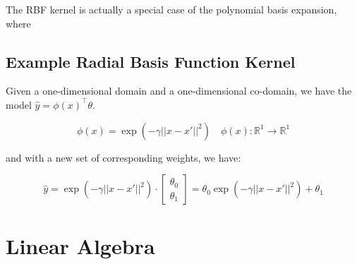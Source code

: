     The RBF kernel is actually a special case of the polynomial basis expansion, where 


\subsection{Example Radial Basis Function Kernel}
Given a one-dimensional domain and a one-dimensional co-domain, we have the model $\hat{y} = \phi(x)^\top \theta$.

\begin{equation}
    \phi(x) = \exp(-\gamma ||x - x'||^2) \quad \phi(x) : \mathbb{R}^1 \rightarrow \mathbb{R}^1
\end{equation}

and with a new set of corresponding weights, we have:

\begin{equation}
    \hat{y} = \exp(-\gamma ||x - x'||^2) \cdot \begin{bmatrix} \theta_0 \\ \theta_1 \end{bmatrix} = \theta_0 \exp(-\gamma ||x - x'||^2) + \theta_1
\end{equation}


\section{Linear Algebra}








